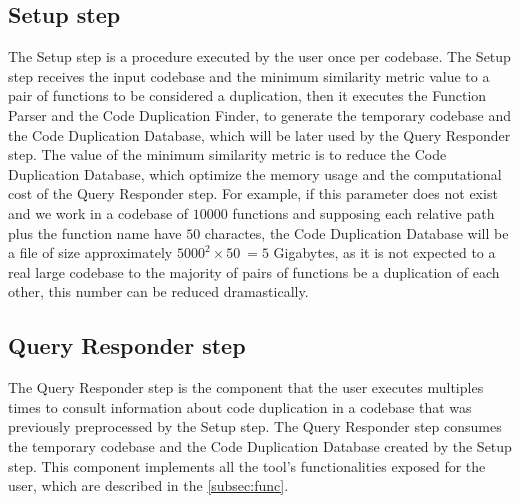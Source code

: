 \subsection{Setup step}

The Setup step is a procedure executed by the user once per codebase. The Setup step receives the input codebase and the minimum
similarity metric value to a pair of functions to be considered a duplication, then it executes the Function Parser and the Code 
Duplication Finder, to generate the temporary codebase and the Code Duplication Database, which will be later used by the Query
Responder step. The value of the minimum similarity metric is to reduce the Code Duplication Database, which optimize the
memory usage and the computational cost of the Query Responder step. For example, if this parameter does not exist and we work in 
a codebase of $10000$ functions and supposing each relative path plus the function name have $50$ charactes, the Code Duplication 
Database will be a file of size approximately $5000^2 \times 50 ~= 5$ Gigabytes, as it is not expected to a real large codebase 
to the majority of pairs of functions be a duplication of each other, this number can be reduced dramastically.

\subsection{Query Responder step}

The Query Responder step is the component that the user executes multiples times to consult information about code duplication in
a codebase that was previously preprocessed by the Setup step. The Query Responder step consumes the temporary codebase and the 
Code Duplication Database created by the Setup step. This component implements all the tool's functionalities exposed 
for the user, which are described in the \ref{subsec:func}.


